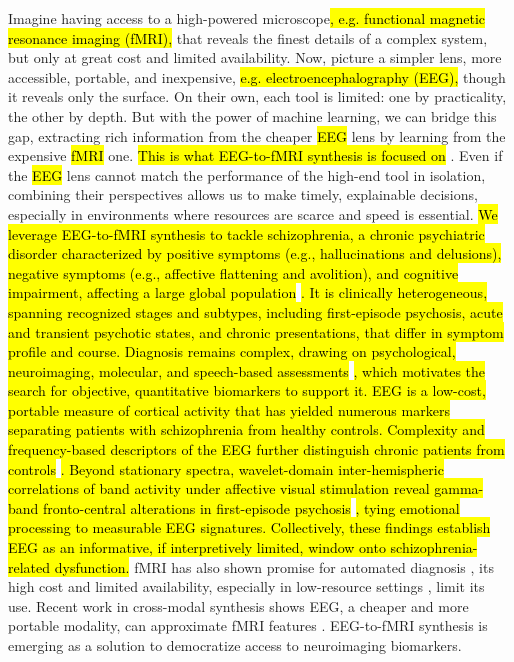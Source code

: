 \documentclass{article}
\begin{document}
Imagine having access to a high-powered microscope\hl{, e.g. functional magnetic resonance imaging (fMRI),} that reveals the finest details of a complex system, but only at great cost and limited availability. Now, picture a simpler lens, more accessible, portable, and inexpensive, \hl{e.g. electroencephalography (EEG),} though it reveals only the surface. On their own, each tool is limited: one by practicality, the other by depth. But with the power of machine learning, we can bridge this gap, extracting rich information from the cheaper \hl{EEG} lens by learning from the expensive \hl{fMRI} one. \hl{This is what EEG-to-fMRI synthesis is focused on} \cite{calhas2022eeg}. Even if the \hl{EEG} lens cannot match the performance of the high-end tool in isolation, combining their perspectives allows us to make timely, explainable decisions, especially in environments where resources are scarce and speed is essential. \hl{We leverage EEG-to-fMRI synthesis to tackle schizophrenia, a chronic psychiatric disorder characterized by positive symptoms (e.g., hallucinations and delusions), negative symptoms (e.g., affective flattening and avolition), and cognitive impairment, affecting a large global population }\cite{saha2005systematic}\hl{. It is clinically heterogeneous, spanning recognized stages and subtypes, including first-episode psychosis, acute and transient psychotic states, and chronic presentations, that differ in symptom profile and course. Diagnosis remains complex, drawing on psychological, neuroimaging, molecular, and speech-based assessments }\cite{andreou2020structural,neale2015genetic,corcoran2020language}\hl{, which motivates the search for objective, quantitative biomarkers to support it. EEG is a low-cost, portable measure of cortical activity that has yielded numerous markers separating patients with schizophrenia from healthy controls. Complexity and frequency-based descriptors of the EEG further distinguish chronic patients from controls }\cite{tan2016eeg}\hl{.  Beyond stationary spectra, wavelet-domain inter-hemispheric correlations of band activity under affective visual stimulation reveal gamma-band fronto-central alterations in first-episode psychosis }\cite{aydin2018cortical}\hl{, tying emotional processing to measurable EEG signatures. Collectively, these findings establish EEG as an informative, if interpretively limited, window onto schizophrenia-related dysfunction.} fMRI has also shown promise for automated diagnosis \cite{oh2020identifying, velakoulis2006hippocampal, haukvik2013schizophrenia}, its high cost and limited availability, especially in low-resource settings \cite{ogbole2018survey}, limit its use. Recent work in cross-modal synthesis \cite{sikka2018mri,santini2020unpaired,yang2018mri} shows EEG, a cheaper and more portable modality, can approximate fMRI features \cite{abreu2018eeg, daly2019electroencephalography}. EEG-to-fMRI synthesis is emerging as a solution to democratize access to neuroimaging biomarkers.
\end{document}
